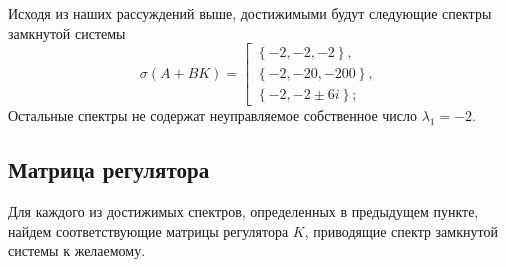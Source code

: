 \documentclass[a4paper, 12pt]{article}
\begin{document}
    Исходя из наших рассуждений выше, достижимыми будут следующие спектры замкнутой системы
    $$
    \sigma\left(A+BK\right)= 
    \left[ 
      \begin{gathered} 
        \left\{-2,-2,-2\right\}, \\ 
        \left\{-2,-20,-200\right\},\\
        \left\{-2,-2\pm6i\right\};
      \end{gathered} 
\right.
    $$
    Остальные спектры не содержат неуправляемое собственное число $\lambda_1=-2$.


    \subsection{Матрица регулятора}
    Для каждого из достижимых спектров, определенных в предыдущем пункте, найдем
    соответствующие матрицы регулятора $K$, приводящие спектр замкнутой системы
    к желаемому.
\end{document}
